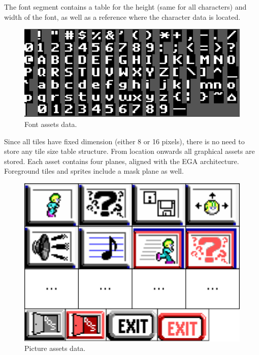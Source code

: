 \documentclass[book.tex]{subfiles}
\begin{document}
The font segment contains a table for the height (same for all characters) and width of the font, as well as a reference where the character data is located.\\
\par
\begin{minipage}{\textwidth}
 \par
 \end{minipage}
\begin{figure}[H] 
  \centering 
  \includegraphics[width=1.0\textwidth, frame]{screenshots_300dpi/font.png}
  \caption{Font assets data.}
  \label{fig:font_assets}
\end{figure} 

Since all tiles have fixed dimension (either 8 or 16 pixels), there is no need to store any tile size table structure. From  location onwards all graphical assets are stored. Each asset contains four planes, aligned with the EGA architecture. Foreground tiles and sprites include a mask plane as well.
 
\begin{figure}[H] 
  \centering 
  \includegraphics[width=1.0\textwidth, frame]{screenshots_300dpi/pics_assets.png}
  \caption{Picture assets data.}
  \label{fig:picture_assets}
\end{figure} 
\end{document}
